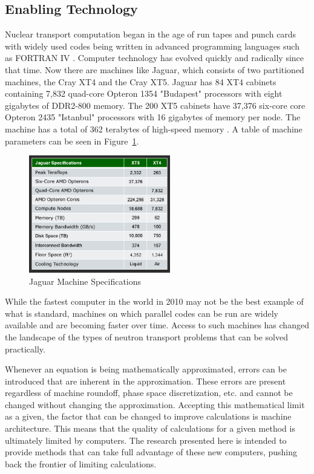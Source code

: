 \subsection{Enabling Technology}
Nuclear transport computation began in the age of run tapes and punch cards with widely used codes being written in advanced programming languages such as FORTRAN IV \cite{Fortran1998}. Computer technology has evolved quickly and radically since that time. Now there are machines like Jaguar, which consists of two partitioned machines, the Cray XT4 and the Cray XT5. Jaguar has 84 XT4 cabinets containing 7,832 quad-core Opteron 1354 "Budapest" processors with eight gigabytes of DDR2-800 memory. The 200 XT5 cabinets have 37,376 six-core core Opteron 2435 "Istanbul" processors with 16 gigabytes of memory per node. The machine has a total of 362 terabytes of high-speed memory \cite{Sciences2010}. A table of machine parameters can be seen in Figure~\ref{fig:jaguar}. 

\begin{figure}[!h]
  \begin{center}
    \includegraphics [width=0.55\textwidth, height=0.35\textheight ] {jaguarSpecs09}
  \end{center}
  \caption{Jaguar Machine Specifications \cite{Sciences2010}}
  \label{fig:jaguar}
\end{figure}

While the fastest computer in the world in 2010 may not be the best example of what is standard, machines on which parallel codes can be run are widely available and are becoming faster over time. Access to such machines has changed the landscape of the types of neutron transport problems that can be solved practically. 

Whenever an equation is being mathematically approximated, errors can be introduced that are inherent in the approximation. These errors are present regardless of machine roundoff, phase space discretization, etc. and cannot be changed without changing the approximation. Accepting this mathematical limit as a given, the factor that can be changed to improve calculations is machine architecture. This means that the quality of calculations for a given method is ultimately limited by computers. The research presented here is intended to provide methods that can take full advantage of these new computers, pushing back the frontier of limiting calculations.

